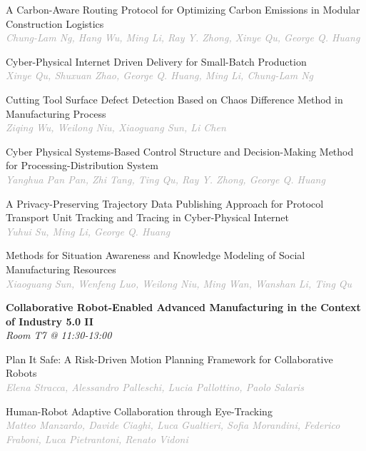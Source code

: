 \begin{multicols*}{2}
\small A Carbon-Aware Routing Protocol for Optimizing Carbon Emissions in Modular Construction Logistics\\ 
\footnotesize \textcolor{darkgray}{\textit{Chung-Lam Ng, Hang  Wu, Ming  Li, Ray Y.  Zhong, Xinye  Qu, George Q.  Huang}}

\small Cyber-Physical Internet Driven Delivery for Small-Batch Production\\ 
\footnotesize \textcolor{darkgray}{\textit{Xinye Qu, Shuxuan  Zhao, George Q.  Huang, Ming  Li, Chung-Lam  Ng}}

\small Cutting Tool Surface Defect Detection Based on Chaos Difference Method in Manufacturing Process\\ 
\footnotesize \textcolor{darkgray}{\textit{Ziqing Wu, Weilong  Niu, Xiaoguang  Sun, Li  Chen}}

\small Cyber Physical Systems-Based Control Structure and Decision-Making Method for Processing-Distribution System\\ 
\footnotesize \textcolor{darkgray}{\textit{Yanghua Pan Pan, Zhi  Tang, Ting  Qu, Ray Y.  Zhong, George Q.  Huang}}

\small A Privacy-Preserving Trajectory Data Publishing Approach for Protocol Transport Unit Tracking and Tracing in Cyber-Physical Internet\\ 
\footnotesize \textcolor{darkgray}{\textit{Yuhui Su, Ming  Li, George Q.  Huang}}

\small Methods for Situation Awareness and Knowledge Modeling of Social Manufacturing Resources\\ 
\footnotesize \textcolor{darkgray}{\textit{Xiaoguang Sun, Wenfeng  Luo, Weilong  Niu, Ming  Wan, Wanshan  Li, Ting  Qu}}

\normalsize \textbf{Collaborative Robot-Enabled Advanced Manufacturing in the Context of Industry 5.0 II}\\
\small \textit{Room T7 @ 11:30-13:00}

\small Plan It Safe: A Risk-Driven Motion Planning Framework for Collaborative Robots\\ 
\footnotesize \textcolor{darkgray}{\textit{Elena Stracca, Alessandro  Palleschi, Lucia  Pallottino, Paolo  Salaris}}

\small Human-Robot Adaptive Collaboration through Eye-Tracking\\ 
\footnotesize \textcolor{darkgray}{\textit{Matteo Manzardo, Davide  Ciaghi, Luca  Gualtieri, Sofia  Morandini, Federico  Fraboni, Luca  Pietrantoni, Renato  Vidoni}}


\end{multicols*}
